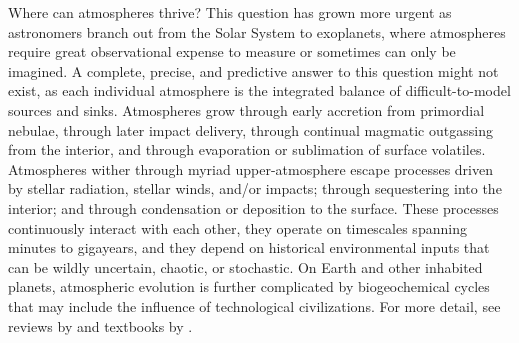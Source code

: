\documentclass[modern,linenumbers,trackchanges]{aastex7}
\begin{document}
Where can atmospheres thrive? This question has grown more urgent as astronomers branch out from the Solar System to exoplanets, where atmospheres require great observational expense to measure or sometimes can only be imagined. A complete, precise, and predictive answer to this question might not exist, as each individual atmosphere is the integrated balance of difficult-to-model sources and sinks. Atmospheres grow through early accretion from primordial nebulae, through later impact delivery, through continual magmatic outgassing from the interior, and through evaporation or sublimation of surface volatiles. Atmospheres wither through myriad upper-atmosphere escape processes driven by stellar radiation, stellar winds, and/or impacts; through sequestering into the interior; and through condensation or deposition to the surface. These processes continuously interact with each other, they operate on timescales spanning minutes to gigayears, and they depend on historical environmental inputs that can be wildly uncertain, chaotic, or stochastic. On Earth and other inhabited planets, atmospheric evolution is further complicated by biogeochemical cycles that may include the influence of technological civilizations. For more detail, see reviews by \citet{johnsonExospheresAtmosphericEscape2008, lammerAtmosphericEscapeEvolution2008, tianAtmosphericEscapeSolar2015b, owenAtmosphericEscapeEvolution2019a,  gronoffAtmosphericEscapeProcesses2020, wordsworthAtmospheresRockyExoplanets2022} and textbooks by \citet{chamberlainTheoryPlanetaryAtmospheres1987, pierrehumbertPrinciplesPlanetaryClimate2010, seagerExoplanetAtmospheresPhysical2010, ingersollPlanetaryClimates2013, tianAtmosphericEscapeSolar2015a, lissauerFundamentalPlanetaryScience2019}.
 
\end{document}
